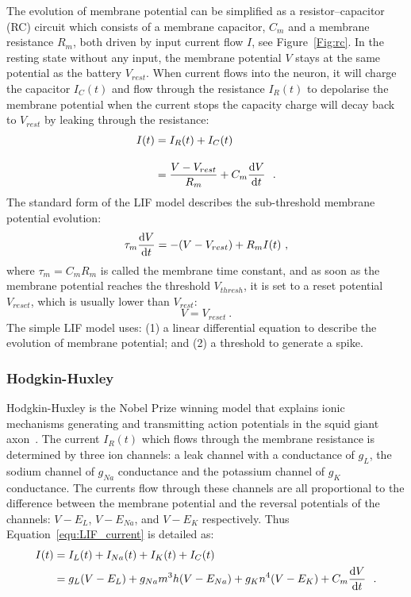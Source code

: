 The evolution of membrane potential can be simplified as a resistor–capacitor (RC) circuit which consists of a membrane capacitor, $C_m$ and a membrane resistance $R_m$, both driven by input current flow $I$, see Figure~\ref{Fig:rc}.
In the resting state without any input, the membrane potential $V$ stays at the same potential as the battery $V_{rest}$.
When current flows into the neuron, it will charge the capacitor $I_C(t)$ and flow through the resistance $I_R(t)$ to depolarise the membrane potential when the current stops the capacity charge will decay back to $V_{rest}$ by leaking through the resistance:
\begin{equation}
\begin{aligned}
	I(t) &= I_R(t) + I_C(t) \\[10pt]
	&= \dfrac{V-V_{rest}}{R_m} + C_m \dfrac{\mathrm{d} V}{\mathrm{d} t}~~.
\end{aligned}
\label{equ:LIF_current}
\end{equation}
The standard form of the LIF model describes the sub-threshold membrane potential evolution:
\begin{equation}
	\tau_m \dfrac{\mathrm{d} V}{\mathrm{d} t} = -(V-V_{rest}) + R_m I(t)~,
\end{equation}
where $\tau_m = C_m R_m$ is called the membrane time constant, and as soon as the membrane potential reaches the threshold $V_{thresh}$, it is set to a reset potential $V_{reset}$, which is usually lower than $V_{rest}$: 
\begin{equation}
V = V_{reset}~.
\end{equation}
The simple LIF model uses: (1) a linear differential equation to describe the evolution of membrane potential;
and (2) a threshold to generate a spike.

\subsubsection{Hodgkin-Huxley}
Hodgkin-Huxley is the Nobel Prize winning model that explains ionic mechanisms generating and transmitting action potentials in the squid giant axon~\cite{hodgkin1939action}.
The current $I_R(t)$ which flows through the membrane resistance is determined by three ion channels: a leak channel with a conductance of $g_L$, the sodium channel of $g_{Na}$ conductance and the potassium channel of  $g_{K}$ conductance.
The currents flow through these channels are all proportional to the difference between the membrane potential and the reversal potentials of the channels: $V-E_L$, $V-E_{Na}$, and $V-E_{K}$ respectively.
Thus Equation~\ref{equ:LIF_current} is detailed as:
\begin{equation}
\begin{aligned}
I(t) &= I_L(t) + I_{Na}(t) + I_{K}(t)+ I_C(t) \\
&= g_L(V-E_L) + g_{Na}m^3h(V-E_{Na}) + g_{K}n^4(V-E_{K})  + C_m \dfrac{\mathrm{d} V}{\mathrm{d} t}~~.
\end{aligned}
\label{equ:HH_current}
\end{equation}
 
